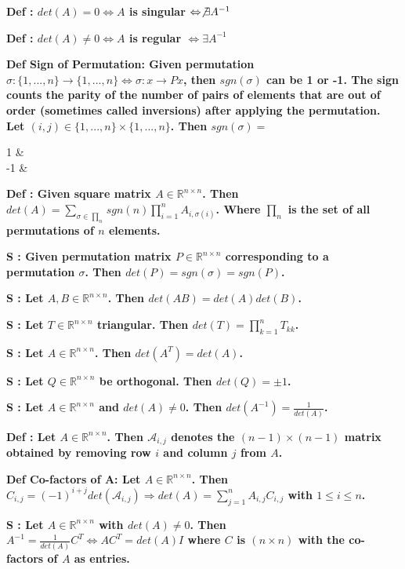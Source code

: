 \documentclass[7pt,landscape, margin = 0.1mm]{article}
\newcommand{\DEF}[2]{\color{chaptercolor}\bf{Def #1}:\color{black}    \hspace{0.2cm} #2}
\newcommand{\SA}[2]{\color{chaptercolor}\bf{S #1}:\color{black}    \hspace{0.2cm} #2}
\begin{document}
\begin{multicols}{4}
\begin{flushleft}
{\DEF{}{$det(A) = 0 \Leftrightarrow A $ is singular $\Leftrightarrow \not\exists A^{-1}$}

\DEF{}{$det(A) \neq 0 \Leftrightarrow A $ is regular $\Leftrightarrow \exists A^{-1}$}

\DEF{Sign of Permutation}{Given permutation $\sigma:\{1,...,n\}\rightarrow\{1,...,n\} \Leftrightarrow \sigma: x \rightarrow Px$, then $sgn(\sigma)$ can be 1 or -1. The sign counts the parity of the number of pairs of elements that are out of order (sometimes called inversions) after applying the permutation.
Let $(i,j)\in\{1,...,n\}\times\{1,...,n\}$. Then $sgn(\sigma)=$
\begin{cases}
    1 & \text{if $|i < j \land \sigma(i)>\sigma(j)|$ is even}\\
    -1 & \text{if $|i < j \land \sigma(i)>\sigma(j)|$ is odd}
\end{cases}}

\DEF{}{Given square matrix $A\in\mathbb{R}^{n\times n}$. Then $det(A)=\sum_{\sigma\in\prod_n}sgn(n)\prod_{i=1}^nA_{i,\sigma(i)}$. Where $\prod_n$ is the set of all permutations of $n$ elements.}

\SA{}{Given permutation matrix $P\in\mathbb{R}^{n\times n}$ corresponding to a permutation $\sigma$. Then $det(P)=sgn(\sigma)=sgn(P)$.}

\SA{}{Let $A,B\in\mathbb{R}^{n\times n}$. Then $det(AB)=det(A)det(B)$.}

\SA{}{Let $T\in\mathbb{R}^{n\times n}$ triangular. Then $det(T)=\prod_{k=1}^nT_{kk}$.}

\SA{}{Let $A\in\mathbb{R}^{n\times n}$. Then $det(A^T)=det(A)$.}

\SA{}{Let $Q\in\mathbb{R}^{n\times n}$ be orthogonal. Then $det(Q) = \pm1$.}

\SA{}{Let $A\in\mathbb{R}^{n\times n}$ and $det(A)\not=0$. Then $det(A^{-1})=\frac{1}{det(A)}$.}

\DEF{}{Let $A\in\mathbb{R}^{n\times n}$. Then $\mathscr{A}_{i,j}$ denotes the $(n-1)\times(n-1)$ matrix obtained by removing row $i$ and column $j$ from $A$.}

\DEF{Co-factors of A}{Let $A\in\mathbb{R}^{n\times n}$. Then $C_{i,j}=(-1)^{i+j}det(\mathscr{A}_{i,j}) \Rightarrow det(A)=\sum_{j=1}^nA_{i,j}C_{i,j}$ with $1 \leq i \leq n$.}

\SA{}{Let $A\in\mathbb{R}^{n\times n}$ with $det(A)\neq0$. Then $A^{-1}=\frac{1}{det(A)}C^T \Leftrightarrow AC^T=det(A)I$ where $C$ is $(n\times n)$ with the co-factors of $A$ as entries.}

}
\end{flushleft}
\end{multicols}
\end{document}
